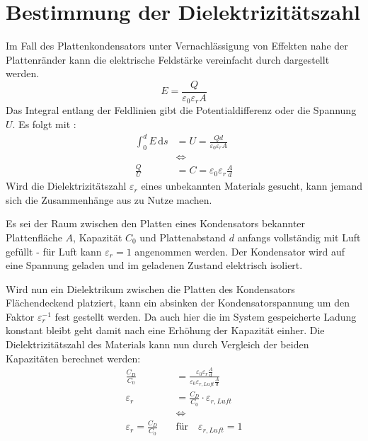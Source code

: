 \section{Bestimmung der Dielektrizitätszahl}
Im Fall des Plattenkondensators unter Vernachlässigung von Effekten nahe der Plattenränder kann die elektrische Feldstärke
vereinfacht durch  \cite{Halliday.2005} dargestellt werden.
\begin{equation}
    E = \frac{Q}{\varepsilon_0\varepsilon_r A}
    \label{eq:feldPlatte}
\end{equation}
Das Integral entlang der Feldlinien gibt die Potentialdifferenz oder die Spannung \(U\). Es folgt mit :
\begin{align}
    \int_{0}^{d} E \,\mathrm{d}s &= U = \frac{Q d}{\varepsilon_0\varepsilon_r A} \\
    &\Leftrightarrow \nonumber \\
    \frac{Q}{U} &= C = \varepsilon_0 \varepsilon_r \frac{A}{d}
    \label{eq:feldPlatte2}
\end{align}
Wird die Dielektrizitätszahl \(\varepsilon_r\) eines unbekannten Materials gesucht, kann jemand sich die Zusammenhänge
aus  zu Nutze machen.\par
Es sei der Raum zwischen den Platten eines Kondensators bekannter Plattenfläche \(A\), Kapazität \(C_0\) und Plattenabstand \(d\)
anfangs vollständig mit Luft gefüllt - für Luft kann \(\varepsilon_r = 1\) angenommen werden. Der Kondensator wird auf
eine Spannung geladen und im geladenen Zustand elektrisch isoliert.\par
Wird nun ein Dielektrikum zwischen die Platten des Kondensators Flächendeckend platziert, kann ein absinken der
Kondensatorspannung um den Faktor \(\varepsilon_r^{-1}\) fest gestellt werden. Da auch hier die im System gespeicherte Ladung
konstant bleibt geht damit nach  eine Erhöhung der Kapazität einher. Die Dielektrizitätszahl des Materials
kann nun durch Vergleich der beiden Kapazitäten berechnet werden:
\begin{align}
    \frac{C_D}{C_0} &= \frac{\varepsilon_0\varepsilon_r \frac{A}{d}}{\varepsilon_0\varepsilon_{r,Luft} \frac{A}{d}} \nonumber \\
    \varepsilon_r &= \frac{C_D}{C_0} \cdot \varepsilon_{r,Luft} \nonumber \\
    &\Leftrightarrow \nonumber \\
    \varepsilon_r = \frac{C_D}{C_0} \quad &\text{für} \quad \varepsilon_{r,Luft} = 1
    \label{eq:rel_feld}
\end{align}

